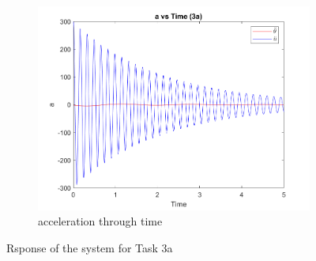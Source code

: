 \documentclass[a4paper,12pt]{article}
\begin{document}
\begin{figure}[h]
  \vspace{0.5cm}

  \begin{subfigure}[b]{0.5\textwidth}
      \includegraphics[width=\textwidth]{../../Matlab/task3a_plots/a_vs_time.png}
      \caption{acceleration through time}
      \label{fig:image3}
  \end{subfigure}
  \hfill
  
  \caption{Rsponse of the system for Task 3a}
  \label{fig:response_task3a}
\end{figure}

\end{document}
